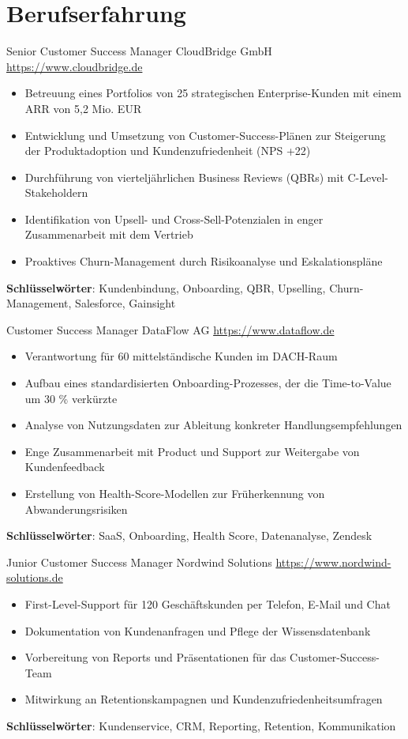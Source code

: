 \documentclass[a4paper, serif, 10pt]{moderncv}
\begin{document}
\section{Berufserfahrung}

        {Senior Customer Success Manager}
        {CloudBridge GmbH}
        {\url{https://www.cloudbridge.de}}
        {}
        {\begin{itemize}
\item Betreuung eines Portfolios von 25 strategischen Enterprise-Kunden mit einem ARR von 5,2 Mio. EUR
\item Entwicklung und Umsetzung von Customer-Success-Plänen zur Steigerung der Produktadoption und Kundenzufriedenheit (NPS +22)
\item Durchführung von vierteljährlichen Business Reviews (QBRs) mit C-Level-Stakeholdern
\item Identifikation von Upsell- und Cross-Sell-Potenzialen in enger Zusammenarbeit mit dem Vertrieb
\item Proaktives Churn-Management durch Risikoanalyse und Eskalationspläne
\end{itemize}
\textbf{Schlüsselwörter}: Kundenbindung, Onboarding, QBR, Upselling, Churn-Management, Salesforce, Gainsight}

        {Customer Success Manager}
        {DataFlow AG}
        {\url{https://www.dataflow.de}}
        {}
        {\begin{itemize}
\item Verantwortung für 60 mittelständische Kunden im DACH-Raum
\item Aufbau eines standardisierten Onboarding-Prozesses, der die Time-to-Value um 30 \% verkürzte
\item Analyse von Nutzungsdaten zur Ableitung konkreter Handlungsempfehlungen
\item Enge Zusammenarbeit mit Product und Support zur Weitergabe von Kundenfeedback
\item Erstellung von Health-Score-Modellen zur Früherkennung von Abwanderungsrisiken
\end{itemize}
\textbf{Schlüsselwörter}: SaaS, Onboarding, Health Score, Datenanalyse, Zendesk}

        {Junior Customer Success Manager}
        {Nordwind Solutions}
        {\url{https://www.nordwind-solutions.de}}
        {}
        {\begin{itemize}
\item First-Level-Support für 120 Geschäftskunden per Telefon, E-Mail und Chat
\item Dokumentation von Kundenanfragen und Pflege der Wissensdatenbank
\item Vorbereitung von Reports und Präsentationen für das Customer-Success-Team
\item Mitwirkung an Retentionskampagnen und Kundenzufriedenheitsumfragen
\end{itemize}
\textbf{Schlüsselwörter}: Kundenservice, CRM, Reporting, Retention, Kommunikation}
\end{document}

